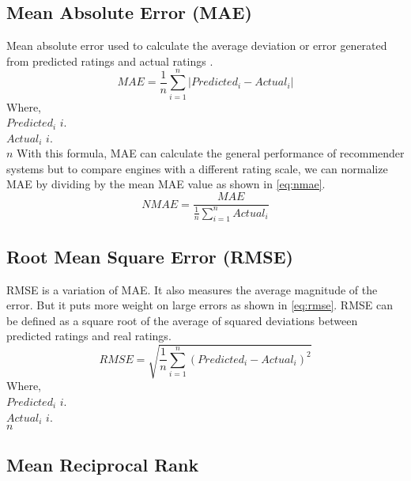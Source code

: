 \subsection{Mean Absolute Error (MAE)}
Mean absolute error used to calculate the average deviation or error generated from predicted ratings and actual ratings \cite{26}.
\begin{equation}
MAE = \frac{1}{n} \sum_{i=1}^{n}{\vert{Predicted_i - Actual_i} \vert}
\label{eq:mae}
\end{equation}
\noindent Where, \\ 
$Predicted_i$  $i.$ \\
$Actual_i$  $i.$ \\
$n$ 
\noindent With this formula, MAE can calculate the general performance of recommender systems but to compare engines with a different rating scale, we can normalize MAE by dividing by the mean MAE value as shown in \autoref{eq:nmae}. 
\begin{equation}
NMAE = \frac{MAE} {\frac{1}{n} \sum_{i=1}^{n}{Actual_i}}
\label{eq:nmae}
\end{equation}


\subsection{Root Mean Square Error (RMSE)}
RMSE is a variation of MAE. It also measures the average magnitude of the error. But it puts more weight on large errors as shown in \autoref{eq:rmse}. RMSE can be defined as a square root of the average of squared deviations between predicted ratings and real ratings.
\begin{equation}
RMSE = \sqrt{ \frac{1}{n} \sum_{i=1}^{n}{({Predicted_i - Actual_i} ) ^ {2}}}
\label{eq:rmse}
\end{equation}
\noindent Where, \\
$Predicted_i$  $i.$ \\
$Actual_i$  $i.$ \\
$n$ 

\subsection{Mean Reciprocal Rank}

